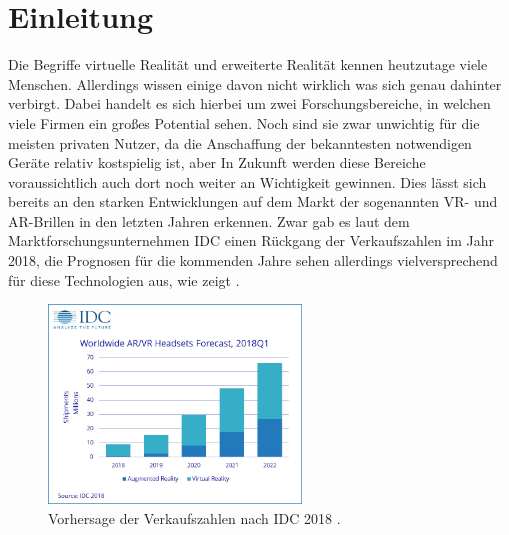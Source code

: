 
\chapter{Einleitung}\label{chapter:introduction}

	
	
	Die Begriffe virtuelle Realität und erweiterte Realität kennen heutzutage viele Menschen. Allerdings wissen einige davon nicht wirklich was sich genau dahinter verbirgt. Dabei handelt es sich hierbei um zwei Forschungsbereiche, in welchen viele Firmen ein großes Potential sehen. Noch sind sie zwar unwichtig für die meisten privaten Nutzer, da die Anschaffung der bekanntesten notwendigen Geräte relativ kostspielig ist, aber In Zukunft werden diese Bereiche voraussichtlich auch dort noch weiter an Wichtigkeit gewinnen.
	Dies lässt sich bereits an den starken Entwicklungen auf dem Markt der sogenannten VR- und AR-Brillen in den letzten Jahren erkennen.
	Zwar gab es laut dem Marktforschungsunternehmen IDC einen Rückgang der Verkaufszahlen im Jahr 2018, die Prognosen für die kommenden Jahre sehen allerdings vielversprechend für diese Technologien aus, wie  zeigt \cite{verkaufVR}.
	
	\begin{figure}[htbp]
		\centering
		\includegraphics[width=0.6\textwidth]{figures/IDC-2018.jpg}
		\caption{Vorhersage der Verkaufszahlen nach IDC 2018 .}
		\label{fig:forecast_diagram}
	\end{figure}
	
